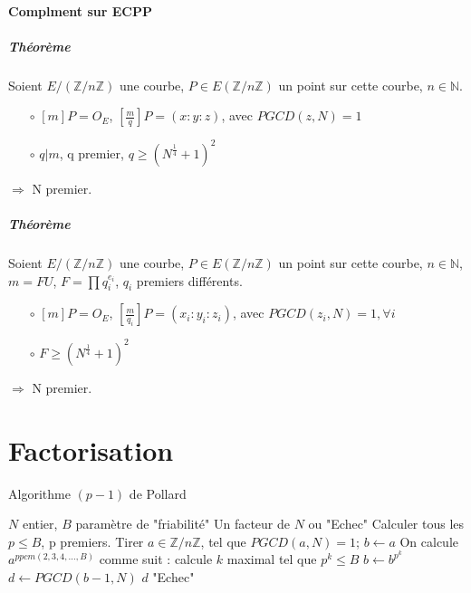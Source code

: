 \documentclass[12pt,a4paper]{report}
\begin{document}
\paragraph{Complment sur ECPP\\}
\subparagraph{Théorème\\}
Soient $ E/(\mathbb{Z}/n\mathbb{Z})$ une courbe, $P \in E(\mathbb{Z}/n\mathbb{Z})$ un point sur cette courbe, $n \in \mathbb{N}$.
\begin{itemize}
\item[$\circ$]$[m]P=O_E$, $\left[\frac{m}{q}\right]P = (x:y:z)$, avec $PGCD(z,N)=1$
\item[$\circ$]$q|m$, q premier, $ q \geqslant \left(N^{\frac{1}{4}} + 1\right)^2$
\end{itemize}
$\Rightarrow$ N premier.
\subparagraph{Théorème\\}
Soient $ E/(\mathbb{Z}/n\mathbb{Z})$ une courbe, $P \in E(\mathbb{Z}/n\mathbb{Z})$ un point sur cette courbe, $n \in \mathbb{N}$, $m=FU$, $F=\prod q_i^{e_i}$, $q_i$ premiers différents.
\begin{itemize}
\item[$\circ$]$[m]P=O_E$, $\left[\frac{m}{q_i}\right]P = (x_i:y_i:z_i)$, avec $PGCD(z_i,N)=1, \forall i$
\item[$\circ$]$F \geqslant \left(N^{\frac{1}{4}} + 1\right)^2$
\end{itemize}
$\Rightarrow$ N premier.
\section{Factorisation}
\begin{algorithm}[ht]
\caption{Algorithme $(p-1)$ de Pollard}
\begin{algorithmic}[1]
\REQUIRE $N$ entier, $B$ paramètre de "friabilité"
\ENSURE Un facteur de $N$ ou "Echec"
\STATE Calculer tous les $p \leqslant B$, p premiers.
\STATE Tirer $a \in \mathbb{Z}/n\mathbb{Z}$, tel que $PGCD(a,N)=1$; $b\leftarrow a$
\STATE On calcule $a^{ppcm(2,3,4,\ldots,B)}$ comme suit :
\STATE calcule $k$ maximal tel que $p^k \leqslant B$
\STATE $b \leftarrow b^{p^k}$
\ENDFOR
\STATE $d \leftarrow PGCD(b-1,N)$
\RETURN $d$
\ELSE \RETURN "Echec"
\ENDIF
\end{algorithmic}
\end{algorithm}
\end{document}

